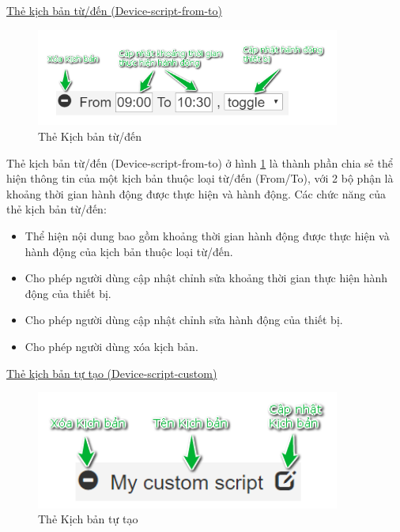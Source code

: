 \documentclass[12pt,a4paper,oneside]{extbook}
\begin{document}
\underline{Thẻ kịch bản từ/đến (Device-script-from-to)}

\begin{figure}[h]
  \centering
     \includegraphics[width=10cm]{6-device-script-from-to}
  \caption{Thẻ Kịch bản từ/đến}\label{fig:6-device-script-from-to}
\end{figure}

Thẻ kịch bản từ/đến (Device-script-from-to) ở hình \ref{fig:6-device-script-from-to} là thành phần chia sẻ thể hiện thông tin của một kịch bản thuộc loại từ/đến (From/To), với 2 bộ phận là khoảng thời gian hành động được thực hiện và hành động. Các chức năng của thẻ kịch bản từ/đến:

\begin{itemize}[topsep=1mm,itemsep=-0.5mm]
\item Thể hiện nội dung bao gồm khoảng thời gian hành động được thực hiện và hành động của kịch bản thuộc loại từ/đến.
\item Cho phép người dùng cập nhật chỉnh sửa khoảng thời gian thực hiện hành động của thiết bị.
\item Cho phép người dùng cập nhật chỉnh sửa hành động của thiết bị.
\item Cho phép người dùng xóa kịch bản.
\vspace{1mm}
\end{itemize}

\underline{Thẻ kịch bản tự tạo (Device-script-custom)}

\begin{figure}[h]
  \centering
     \includegraphics[width=10cm]{6-DeviceScriptCustom}
  \caption{Thẻ Kịch bản tự tạo}\label{fig:6-DeviceScriptCustom}
\end{figure}
\end{document}
